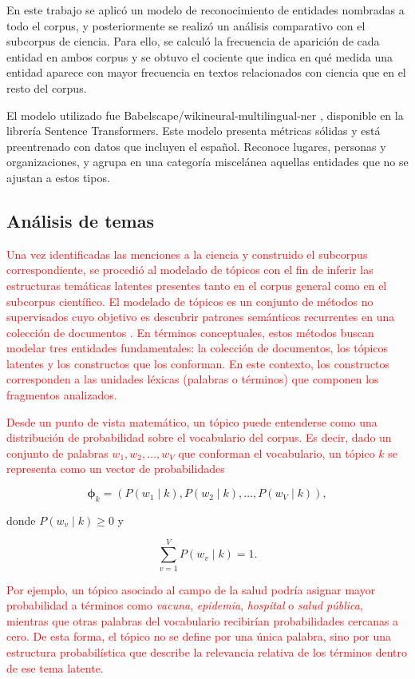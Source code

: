 \documentclass[11pt,a4paper]{article}
\begin{document}
	En este trabajo se aplicó un modelo de reconocimiento de entidades nombradas a todo el corpus, y posteriormente se realizó un análisis comparativo con el subcorpus de ciencia. Para ello, se calculó la frecuencia de aparición de cada entidad en ambos corpus y se obtuvo el cociente que indica en qué medida una entidad aparece con mayor frecuencia en textos relacionados con ciencia que en el resto del corpus.
	
	El modelo utilizado fue Babelscape/wikineural-multilingual-ner \cite{tedeschi-etal-2021-wikineural-combined}, disponible en la librería Sentence Transformers. Este modelo presenta métricas sólidas y está preentrenado con datos que incluyen el español. Reconoce lugares, personas y organizaciones, y agrupa en una categoría miscelánea aquellas entidades que no se ajustan a estos tipos.
	
	\subsection{Análisis de temas}\label{sec:topic_model}
	
	
	\textcolor{red}{Una vez identificadas las menciones a la ciencia y construido el subcorpus correspondiente, se procedió al modelado de tópicos con el fin de inferir las estructuras temáticas latentes presentes tanto en el corpus general como en el subcorpus científico. El modelado de tópicos es un conjunto de métodos no supervisados cuyo objetivo es descubrir patrones semánticos recurrentes en una colección de documentos \cite{Abdelrazek2023}. En términos conceptuales, estos métodos buscan modelar tres entidades fundamentales: la colección de documentos, los tópicos latentes y los constructos que los conforman. En este contexto, los constructos corresponden a las unidades léxicas (palabras o términos) que componen los fragmentos analizados.}
	
	\textcolor{red}{Desde un punto de vista matemático, un tópico puede entenderse como una distribución de probabilidad sobre el vocabulario del corpus. Es decir, dado un conjunto de palabras $w_1, w_2, \dots, w_V$ que conforman el vocabulario, un tópico $k$ se representa como un vector de probabilidades}
	
	\[
	\boldsymbol{\phi}_k = \left( P(w_1 \mid k), P(w_2 \mid k), \dots, P(w_V \mid k) \right),
	\]
	
	donde $P(w_v \mid k) \ge 0$ y
	
	\[
	\sum_{v=1}^{V} P(w_v \mid k) = 1.
	\]
	
	\textcolor{red}{Por ejemplo, un tópico asociado al campo de la salud podría asignar mayor probabilidad a términos como \emph{vacuna}, \emph{epidemia}, \emph{hospital} o \emph{salud pública}, mientras que otras palabras del vocabulario recibirían probabilidades cercanas a cero. De esta forma, el tópico no se define por una única palabra, sino por una estructura probabilística que describe la relevancia relativa de los términos dentro de ese tema latente.}
	
\end{document}
